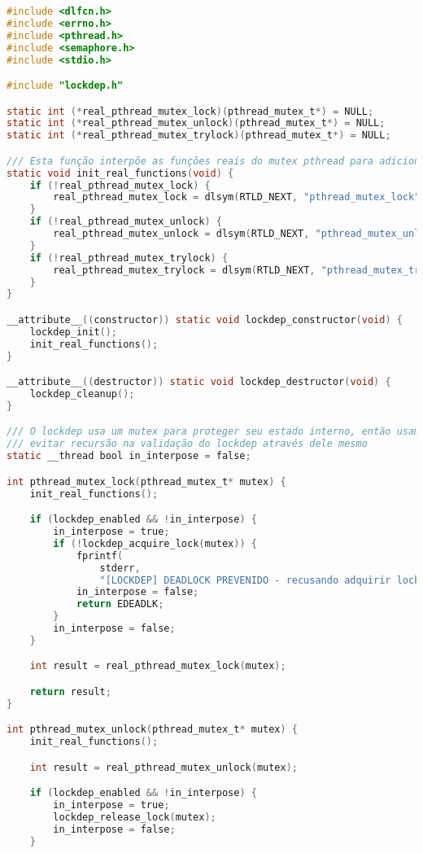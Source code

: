 \begin{lstlisting}[language=C, caption={pthread\_interpose.c - Interposição de funções pthread}]
#include <dlfcn.h>
#include <errno.h>
#include <pthread.h>
#include <semaphore.h>
#include <stdio.h>

#include "lockdep.h"

static int (*real_pthread_mutex_lock)(pthread_mutex_t*) = NULL;
static int (*real_pthread_mutex_unlock)(pthread_mutex_t*) = NULL;
static int (*real_pthread_mutex_trylock)(pthread_mutex_t*) = NULL;

/// Esta função interpõe as funções reais do mutex pthread para adicionar validação lockdep
static void init_real_functions(void) {
    if (!real_pthread_mutex_lock) {
        real_pthread_mutex_lock = dlsym(RTLD_NEXT, "pthread_mutex_lock");
    }
    if (!real_pthread_mutex_unlock) {
        real_pthread_mutex_unlock = dlsym(RTLD_NEXT, "pthread_mutex_unlock");
    }
    if (!real_pthread_mutex_trylock) {
        real_pthread_mutex_trylock = dlsym(RTLD_NEXT, "pthread_mutex_trylock");
    }
}

__attribute__((constructor)) static void lockdep_constructor(void) {
    lockdep_init();
    init_real_functions();
}

__attribute__((destructor)) static void lockdep_destructor(void) {
    lockdep_cleanup();
}

/// O lockdep usa um mutex para proteger seu estado interno, então usamos isto para
/// evitar recursão na validação do lockdep através dele mesmo
static __thread bool in_interpose = false;

int pthread_mutex_lock(pthread_mutex_t* mutex) {
    init_real_functions();

    if (lockdep_enabled && !in_interpose) {
        in_interpose = true;
        if (!lockdep_acquire_lock(mutex)) {
            fprintf(
                stderr,
                "[LOCKDEP] DEADLOCK PREVENIDO - recusando adquirir lock\n");
            in_interpose = false;
            return EDEADLK;
        }
        in_interpose = false;
    }

    int result = real_pthread_mutex_lock(mutex);

    return result;
}

int pthread_mutex_unlock(pthread_mutex_t* mutex) {
    init_real_functions();

    int result = real_pthread_mutex_unlock(mutex);

    if (lockdep_enabled && !in_interpose) {
        in_interpose = true;
        lockdep_release_lock(mutex);
        in_interpose = false;
    }


\end{lstlisting}
